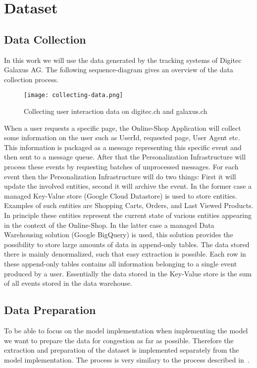 \chapter{Dataset}

\section{Data Collection}
In this work we will use the data generated by the tracking systems of Digitec Galaxus AG.
The following sequence-diagram gives an overview of the data collection process.

\begin{figure}[H]
	\centering
	\captionsetup{width=0.8\textwidth}
    \texttt{[image: collecting-data.png]}
    \caption{Collecting user interaction data on digitec.ch and galaxus.ch}
    \label{fig:collecting_data}
\end{figure}

When a user requests a specific page, the Online-Shop Application will collect some information on the user such as UserId, requested page, User Agent etc.
This information is packaged as a message representing this specific event and then sent to a message queue.
After that the Personalization Infrastructure will process these events by requesting batches of unprocessed messages.
For each event then the Personalization Infrastructure will do two things: First it will update the involved entities, second it will archive the event.
In the former case a managed Key-Value store (Google Cloud Datastore) is used to store entities.
Examples of such entities are Shopping Carts, Orders, and Last Viewed Products.
In principle these entities represent the current state of various entities appearing in the context of the Online-Shop.
In the latter case a managed Data Warehousing solution (Google BigQuery) is used, this solution provides the possibility to store large amounts of data in append-only tables.
The data stored there is mainly denormalized, such that easy extraction is possible.
Each row in these append-only tables contains all information belonging to a single event produced by a user.
Essentially the data stored in the Key-Value store is the sum of all events stored in the data warehouse.

\section{Data Preparation}
To be able to focus on the model implementation when implementing the model we want to prepare the data for congestion as far as possible.
Therefore the extraction and preparation of the dataset is implemented separately from the model implementation.
The process is very similary to the process described in~\cite{hierarchical}.
